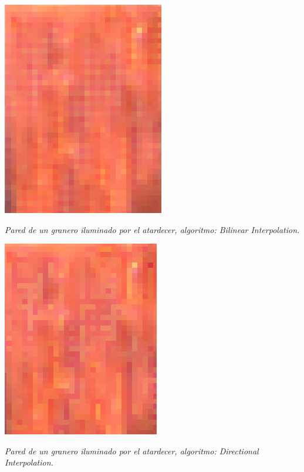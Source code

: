 	\begin{center}
		\includegraphics[scale=.5]{../enunciado/images_files/cualitativo/farm_bilinear.png}
		\vspace{2pt}
		\par
		\footnotesize\textit{Pared de un granero iluminado por el atardecer, algoritmo: Bilinear Interpolation.}
	\end{center}


	\begin{center}
		\includegraphics[scale=.5]{../enunciado/images_files/cualitativo/farm_directional.png}
		\vspace{2pt}
		\par
		\footnotesize\textit{Pared de un granero iluminado por el atardecer, algoritmo: Directional Interpolation.}
	\end{center}


